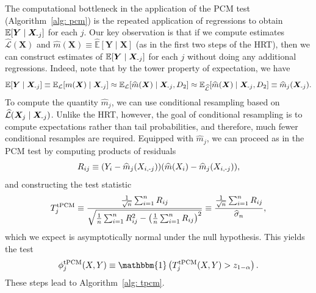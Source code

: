 \documentclass[12pt]{article}
\theoremstyle{definition}
\theoremstyle{remark}
\newcommand{\E}{\mathbb E}								%
\newcommand{\prx}{\bm X}								%
\newcommand{\srx}{X}									%
\newcommand{\pry}{{\bm Y}}								%
\newcommand{\sry}{Y}									%
\newcommand{\law}{\mathcal L}							%
\newcommand{\lawhat}{\widehat{\mathcal L}}				%
\newcommand{\minus}{\textnormal{-}} 						    %
\begin{document}
The computational bottleneck in the application of the PCM test (Algorithm~\ref{alg: pcm}) is the repeated application of regressions to obtain $\E[\pry \mid \prx_{\minus j}]$ for each $j$. Our key observation is that if we compute estimates $\lawhat(\prx)$ and $\widehat m(\prx) \equiv \widehat{\E}[\pry \mid \prx]$ (as in the first two steps of the HRT), then we can construct estimates of $\E[\pry \mid \prx_{\minus j}]$ for each $j$ without doing any additional regressions. Indeed, note that by the tower property of expectation, we have
\begin{equation*}
\E[\pry \mid \prx_{\minus j}] \equiv \E_{\law}[m(\prx) \mid \prx_{\minus j}] \approx \E_{\law}[\widehat m(\prx) \mid \prx_{\minus j}, D_2] \approx \E_{\lawhat}[\widehat m(\prx) \mid \prx_{\minus j}, D_2] \equiv \widehat m_j(\prx_{\minus j}).
\end{equation*}
To compute the quantity $\widehat m_j$, we can use conditional resampling based on $\lawhat(\prx_j \mid \prx_{\minus j})$. Unlike the HRT, however, the goal of conditional resampling is to compute expectations rather than tail probabilities, and therefore, much fewer conditional resamples are required. Equipped with $\widehat m_j$, we can proceed as in the PCM test by computing products of residuals
\begin{equation}
	R_{ij} \equiv (\sry_i  - \widehat m_j(\srx_{i,\minus j}))(\widehat m(\srx_i) - \widehat{m}_j(\srx_{i,\minus j})),
\end{equation}
and constructing the test statistic	
\begin{align}
	T^{\textnormal{tPCM}}_j \equiv \frac{\frac{1}{\sqrt n} \sum_{i=1}^n R_{ij}}{\sqrt{ \frac{1}{n}\sum_{i=1}^n R_{ij}^2 - \left(\frac{1}{n} \sum_{i=1}^n R_{ij} \right)^2}} \equiv \frac{\frac{1}{\sqrt n} \sum_{i=1}^n R_{ij}}{\widehat \sigma_n},
\end{align}
which we expect is asymptotically normal under the null hypothesis. This yields the test
\begin{equation}
\phi_j^{\textnormal{tPCM}}(\srx,\sry) \equiv \mathbbm{1}\left(T^{\textnormal{tPCM}}_j(\srx,\sry) > z_{1-\alpha}\right).
\end{equation}
These steps lead to Algorithm~\ref{alg: tpcm}.
\end{document}
